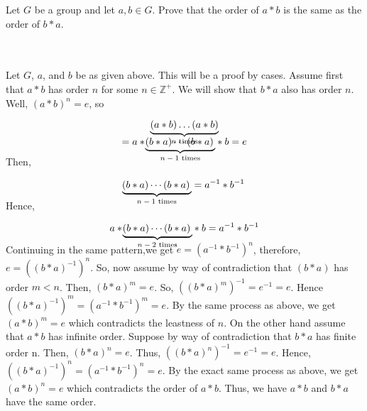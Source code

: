 Let $G$ be a group and let $a,b\in G$. Prove that the order of $a*b$ is the same as the order of
$b*a$.\\\\

\begin{solution}\renewcommand{\qedsymbol}{}\ \\
    Let $G$, $a$, and $b$ be as given above. This will be a proof by cases. Assume first that $a*b$ has
    order $n$ for some $n\in\mathbb{Z}^+$. We will show that $b*a$ also has order $n$. Well,
    $(a*b)^n=e$, so
    
    $$(a*b)\ldots(a*b)\smash{\llap{$\underbrace{\phantom{(a*b)\ldots(a*b)}}_{\text{$n$ times}}$}}$$
    $$=\smash[b]{a*\! \underbrace{(b*a)\cdots(b*a)\,}_\text{$n-1$ times}}*b=e$$
    
    Then,
    
    $$\smash[b]{\! \underbrace{(b*a)\cdots(b*a)\,}_\text{$n-1$ times}}=a^{-1}*b^{-1}$$
    
    Hence,
    
    $$\smash[b]{a*\! \underbrace{(b*a)\cdots(b*a)\,}_\text{$n-2$ times}}*b=a^{-1}*b^{-1}$$
    
    Continuing in the same pattern,we get $e=(a^{-1}*b^{-1})^n$, therefore, $e=((b*a)^{-1})^n$. So, now
    assume by way of contradiction that $(b*a)$ has order $m<n$. Then, $(b*a)^m=e$. So,
    $((b*a)^m)^{-1}=e^{-1}=e$. Hence $((b*a)^{-1})^m=(a^{-1}*b^{-1})^m=e$. By the same process as above,
    we get $(a*b)^m=e$ which contradicts the leastness of $n$. On the other hand assume that $a*b$ has
    infinite order. Suppose by way of contradiction that $b*a$ has finite order n. Then, $(b*a)^n=e$.
    Thus, $((b*a)^n)^{-1}=e^{-1}=e$. Hence, $((b*a)^{-1})^n=(a^{-1}*b^{-1})^n=e$. By the exact same
    process as above, we get $(a*b)^n=e$ which contradicts the order of $a*b$. Thus, we have $a*b$ and
    $b*a$ have the same order.

\end{solution}